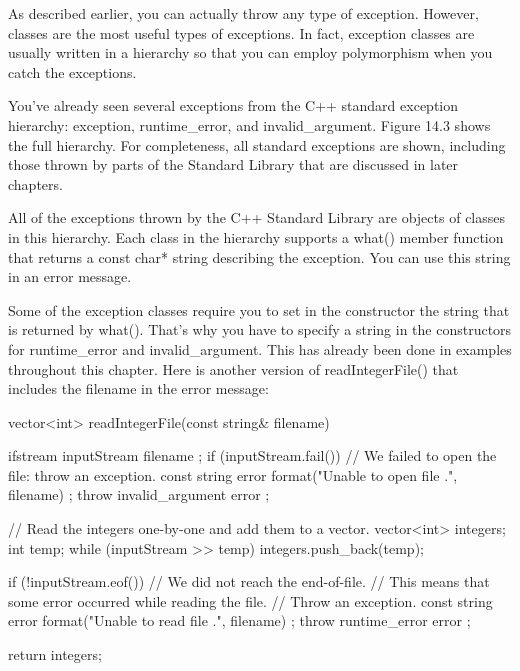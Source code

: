 
As described earlier, you can actually throw any type of exception. However, classes are the most useful types of exceptions. In fact, exception classes are usually written in a hierarchy so that you can employ polymorphism when you catch the exceptions.


You’ve already seen several exceptions from the C++ standard exception hierarchy: exception, runtime\_error, and invalid\_argument. Figure 14.3 shows the full hierarchy. For completeness, all standard exceptions are shown, including those thrown by parts of the Standard Library that are discussed in later chapters.


All of the exceptions thrown by the C++ Standard Library are objects of classes in this hierarchy.
Each class in the hierarchy supports a what() member function that returns a const char* string describing the exception. You can use this string in an error message.

Some of the exception classes require you to set in the constructor the string that is returned by what(). That’s why you have to specify a string in the constructors for runtime\_error and invalid\_argument. This has already been done in examples throughout this chapter. Here is another version of readIntegerFile() that includes the filename in the error message:

\begin{cpp}
vector<int> readIntegerFile(const string& filename)
{
    ifstream inputStream { filename };
    if (inputStream.fail()) {
        // We failed to open the file: throw an exception.
        const string error { format("Unable to open file {}.", filename) };
        throw invalid_argument { error };
    }

    // Read the integers one-by-one and add them to a vector.
    vector<int> integers;
    int temp;
    while (inputStream >> temp) {
        integers.push_back(temp);
    }

    if (!inputStream.eof()) {
        // We did not reach the end-of-file.
        // This means that some error occurred while reading the file.
        // Throw an exception.
        const string error { format("Unable to read file {}.", filename) };
        throw runtime_error { error };
    }

    return integers;
}
\end{cpp}

